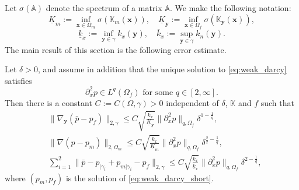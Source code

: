 \documentclass{llncs}
\def\vc#1{\mathbf{\boldsymbol{#1}}}     %
\def\tn#1{{\mathbb{#1}}}    %
\def\norm#1{\|#1\|}
\def\yy{{\vc y}}
\begin{document}


Let $\sigma(\tn A)$ denote the spectrum of a matrix $\tn A$.
We make the following notation:
\[ \underline K_m := \inf_{\vc x\in\Omega_m}\sigma(\tn K_m(\vc x)), \quad \underline K_\yy := \inf_{\vc x\in\Omega_f}\sigma(\tn K_\yy(\vc x)), \]
\[ \underline k_x := \inf_{\yy\in\gamma}k_x(\yy), \quad \overline k_x:=\sup_{\yy\in\gamma}k_n(\yy). \]
The main result of this section is the following error estimate.
\begin{theorem}
\label{th:error_estimate}
Let $\delta>0$, and assume in addition that the unique solution to \eqref{eq:weak_darcy} satisfies
\[ \partial_x^2 p\in L^q(\Omega_f) \mbox{ for some } q\in[2,\infty]. \]
Then there is a constant $C:=C(\Omega,\gamma)>0$ independent of $\delta$, $\tn K$ and $f$ such that
\begin{subequations}
\label{eq:error_estimates_delta}
\begin{align}
&\norm{\nabla_\yy(\bar p - p_f)}_{2,\gamma} \le C\sqrt{\frac{\overline k_x}{\underline K_\yy}}\norm{\partial_x^2 p}_{q,\Omega_f}\delta^{1-\frac1q},\\
&\norm{\nabla(p-p_m)}_{2,\Omega_m} \le C\sqrt{\frac{\overline k_x}{\underline K_m}}\norm{\partial_x^2 p}_{q,\Omega_f}\delta^{\frac32-\frac1q},\\
&\sum_{i=1}^2\norm{\bar p-p_{|\gamma_i}+p_{m|\gamma_i}-p_f}_{2,\gamma} \le C\sqrt{\frac{\overline k_x}{\underline k_x}}\norm{\partial_x^2 p}_{q,\Omega_f}\delta^{2-\frac1q},
\end{align}
\end{subequations}
where $(p_m,p_f)$ is the solution of \eqref{eq:weak_darcy_short}.
\end{theorem}
\end{document}
